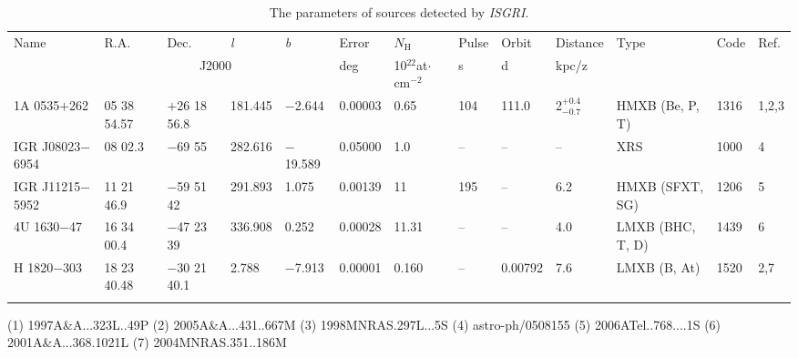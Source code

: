 \begin{table*}[p] \centering 
\label{tab_par} 
\caption{ The parameters of sources detected by \emph{ISGRI}.} 
\begin{scriptsize}
\begin{tabular}{lllllllllllll}
 Name & R.A. & Dec. & \emph{l} & \emph{b} & Error & $N_{\mathrm{H}}$ & Pulse & Orbit & Distance & Type & Code & Ref. \\
  & \multicolumn{4}{c}{J2000}  & deg & 10$^{22}$at$\cdot$cm$^{-2}$ & s & d & kpc/z &  &  &  \\
\noalign{\smallskip}
\noalign{\smallskip}
\hline
\hline
\noalign{\smallskip}
\noalign{\smallskip}
1A 0535$+$262 & 05 38 54.57 & $+$26 18 56.8 & 181.445 & $-$2.644 & 0.00003 & 0.65 & 104 & 111.0 & 2$_{-0.7}^{+0.4}$ & HMXB (Be, P, T) & 1316 & 1,2,3 \\ 
\noalign{\smallskip}
IGR J08023$-$6954 & 08 02.3 & $-$69 55 & 282.616 & $-$19.589 & 0.05000 & 1.0 & -- & -- & -- & XRS & 1000 & 4 \\ 
\noalign{\smallskip}
IGR J11215$-$5952 & 11 21 46.9 & $-$59 51 42 & 291.893 & 1.075 & 0.00139 & 11 & 195 & -- & 6.2 & HMXB (SFXT, SG) & 1206 & 5 \\ 
\noalign{\smallskip}
4U 1630$-$47 & 16 34 00.4 & $-$47 23 39 & 336.908 & 0.252 & 0.00028 & 11.31 & -- & -- & 4.0 & LMXB (BHC, T, D) & 1439 & 6 \\ 
\noalign{\smallskip}
H 1820$-$303 & 18 23 40.48 & $-$30 21 40.1 & 2.788 & $-$7.913 & 0.00001 & 0.160 & -- & 0.00792 & 7.6 & LMXB (B, At) & 1520 & 2,7 \\ 
\noalign{\smallskip}
\vspace{3mm}
\end{tabular}
\end{scriptsize}
\end{table*}



(1) 1997A\&A...323L..49P
(2) 2005A\&A...431..667M
(3) 1998MNRAS.297L...5S
(4) astro-ph/0508155
(5) 2006ATel..768....1S
(6) 2001A\&A...368.1021L
(7) 2004MNRAS.351..186M
